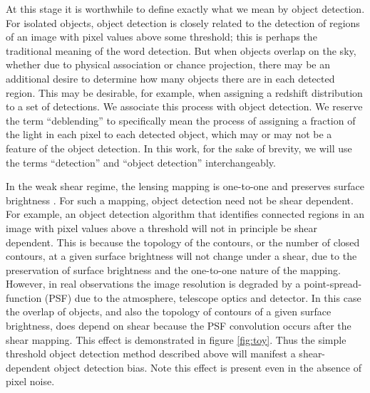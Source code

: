 \documentclass[fleqn,useAMS,usenatbib]{mnras}
\begin{document}
At this stage it is worthwhile to define exactly what we mean by object
detection.  For isolated objects, object detection is closely related to the
detection of regions of an image with pixel values above some threshold; this
is perhaps the traditional meaning of the word detection. But when objects
overlap on the sky, whether due to physical association or chance projection,
there may be an additional desire to determine how many objects there are in
each detected region. This may be desirable, for example, when assigning a
redshift distribution to a set of detections.  We associate this process with
object detection.  We reserve the term ``deblending'' to specifically mean the
process of assigning a fraction of the light in each pixel to each detected
object, which may or may not be a feature of the object detection.  In this
work, for the sake of brevity, we will use the terms ``detection'' and ``object
detection'' interchangeably.

In the weak shear regime, the lensing mapping is one-to-one and preserves
surface brightness \citep{SchneiderBook92}. For such a mapping, object
detection need not be shear dependent. For example, an object detection
algorithm that identifies connected regions in an image with pixel values above
a threshold will not in principle be shear dependent.  This is because the
topology of the contours, or the number of closed contours, at a given surface
brightness will not change under a shear, due to the preservation of surface
brightness and the one-to-one nature of the mapping.  However, in real
observations the image resolution is degraded by a point-spread-function (PSF)
due to the atmosphere, telescope optics and detector. In this case the overlap
of objects, and also the topology of contours of a given surface brightness,
does depend on shear because the PSF convolution occurs after the shear
mapping.  This effect is demonstrated in figure \ref{fig:toy}.  Thus the simple
threshold object detection method described above will manifest a
shear-dependent object detection bias. Note this effect is present even in the
absence of pixel noise.
\end{document}
